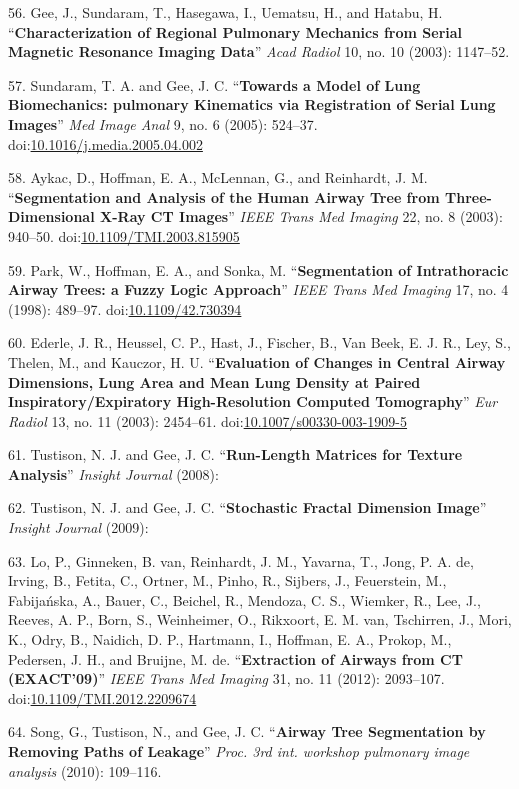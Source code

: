 \documentclass[11pt,]{article}
\begin{document}
56. Gee, J., Sundaram, T., Hasegawa, I., Uematsu, H., and Hatabu, H.
``\textbf{Characterization of Regional Pulmonary Mechanics from Serial
Magnetic Resonance Imaging Data}'' \emph{Acad Radiol} 10, no. 10 (2003):
1147--52.

57. Sundaram, T. A. and Gee, J. C. ``\textbf{Towards a Model of Lung
Biomechanics: pulmonary Kinematics via Registration of Serial Lung
Images}'' \emph{Med Image Anal} 9, no. 6 (2005): 524--37.
doi:\href{http://dx.doi.org/10.1016/j.media.2005.04.002}{10.1016/j.media.2005.04.002}

58. Aykac, D., Hoffman, E. A., McLennan, G., and Reinhardt, J. M.
``\textbf{Segmentation and Analysis of the Human Airway Tree from
Three-Dimensional X-Ray CT Images}'' \emph{IEEE Trans Med Imaging} 22,
no. 8 (2003): 940--50.
doi:\href{http://dx.doi.org/10.1109/TMI.2003.815905}{10.1109/TMI.2003.815905}

59. Park, W., Hoffman, E. A., and Sonka, M. ``\textbf{Segmentation of
Intrathoracic Airway Trees: a Fuzzy Logic Approach}'' \emph{IEEE Trans
Med Imaging} 17, no. 4 (1998): 489--97.
doi:\href{http://dx.doi.org/10.1109/42.730394}{10.1109/42.730394}

60. Ederle, J. R., Heussel, C. P., Hast, J., Fischer, B., Van Beek, E.
J. R., Ley, S., Thelen, M., and Kauczor, H. U. ``\textbf{Evaluation of
Changes in Central Airway Dimensions, Lung Area and Mean Lung Density at
Paired Inspiratory/Expiratory High-Resolution Computed Tomography}''
\emph{Eur Radiol} 13, no. 11 (2003): 2454--61.
doi:\href{http://dx.doi.org/10.1007/s00330-003-1909-5}{10.1007/s00330-003-1909-5}

61. Tustison, N. J. and Gee, J. C. ``\textbf{Run-Length Matrices for
Texture Analysis}'' \emph{Insight Journal} (2008):

62. Tustison, N. J. and Gee, J. C. ``\textbf{Stochastic Fractal
Dimension Image}'' \emph{Insight Journal} (2009):

63. Lo, P., Ginneken, B. van, Reinhardt, J. M., Yavarna, T., Jong, P. A.
de, Irving, B., Fetita, C., Ortner, M., Pinho, R., Sijbers, J.,
Feuerstein, M., Fabija{ń}ska, A., Bauer, C., Beichel, R., Mendoza, C.
S., Wiemker, R., Lee, J., Reeves, A. P., Born, S., Weinheimer, O.,
Rikxoort, E. M. van, Tschirren, J., Mori, K., Odry, B., Naidich, D. P.,
Hartmann, I., Hoffman, E. A., Prokop, M., Pedersen, J. H., and Bruijne,
M. de. ``\textbf{Extraction of Airways from CT (EXACT'09)}'' \emph{IEEE
Trans Med Imaging} 31, no. 11 (2012): 2093--107.
doi:\href{http://dx.doi.org/10.1109/TMI.2012.2209674}{10.1109/TMI.2012.2209674}

64. Song, G., Tustison, N., and Gee, J. C. ``\textbf{Airway Tree
Segmentation by Removing Paths of Leakage}'' \emph{Proc. 3rd int.
workshop pulmonary image analysis} (2010): 109--116.
\end{document}
